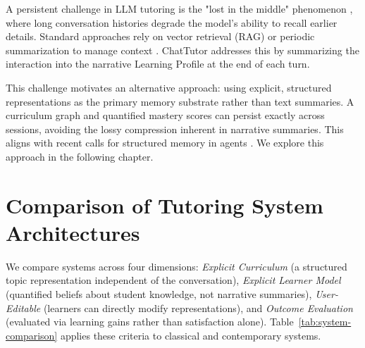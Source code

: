 \documentclass[logo,bsc,singlespacing,parskip,online]{infthesis}
\begin{document}
A persistent challenge in LLM tutoring is the "lost in the middle" phenomenon \citep{liu2023lostinthemiddle}, where long conversation histories degrade the model's ability to recall earlier details. Standard approaches rely on vector retrieval (RAG) or periodic summarization to manage context \citep{xu2024memorysurvey}. ChatTutor addresses this by summarizing the interaction into the narrative Learning Profile at the end of each turn.

This challenge motivates an alternative approach: using explicit, structured representations as the primary memory substrate rather than text summaries. A curriculum graph and quantified mastery scores can persist exactly across sessions, avoiding the lossy compression inherent in narrative summaries. This aligns with recent calls for structured memory in agents \citep{packer2023memgpt}. We explore this approach in the following chapter.

\section{Comparison of Tutoring System Architectures}

We compare systems across four dimensions: \textit{Explicit Curriculum} (a structured topic representation independent of the conversation), \textit{Explicit Learner Model} (quantified beliefs about student knowledge, not narrative summaries), \textit{User-Editable} (learners can directly modify representations), and \textit{Outcome Evaluation} (evaluated via learning gains rather than satisfaction alone). Table~\ref{tab:system-comparison} applies these criteria to classical and contemporary systems.
\end{document}
